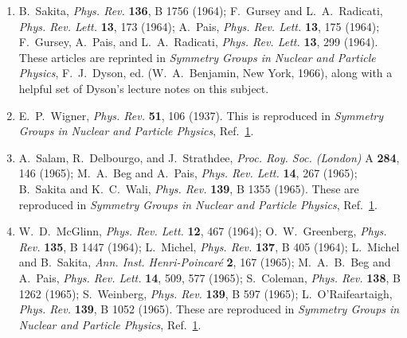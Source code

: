


\begin{enumerate}
  \item {}\label{ch24-ref-1}
  B.~Sakita, \textit{Phys. Rev.} \textbf{136}, B 1756 (1964);
  F.~Gursey and L.~A.~Radicati, \textit{Phys. Rev. Lett.} \textbf{13},
  173 (1964); A.~Pais, \textit{Phys. Rev. Lett.} \textbf{13}, 175
  (1964); F.~Gursey, A.~Pais, and L.~A.~Radicati,
  \textit{Phys. Rev. Lett.} \textbf{13}, 299 (1964). These articles are
  reprinted in \textit{Symmetry Groups in Nuclear and Particle Physics},
  F.~J.~Dyson, ed. (W.~A.~Benjamin, New York, 1966), along with a helpful
  set of Dyson's lecture notes on this subject.

  \item {}\label{ch24-ref-2}
  E.~P.~Wigner, \textit{Phys. Rev.} \textbf{51}, 106 (1937). This is
  reproduced in \textit{Symmetry Groups in Nuclear and Particle Physics},
  Ref.~\hyperref[ch24-ref-1]{1}.

  \item {}\label{ch24-ref-3}
  A.~Salam, R.~Delbourgo, and J.~Strathdee,
  \textit{Proc. Roy. Soc. (London)} A \textbf{284}, 146 (1965);
  M.~A.~Beg and A.~Pais, \textit{Phys. Rev. Lett.} \textbf{14}, 267
  (1965); B.~Sakita and K.~C.~Wali, \textit{Phys. Rev.} \textbf{139},
  B 1355 (1965). These are reproduced in
  \textit{Symmetry Groups in Nuclear and Particle Physics},
  Ref.~\hyperref[ch24-ref-1]{1}.

  \item {}\label{ch24-ref-4}
  W.~D.~McGlinn, \textit{Phys. Rev. Lett.} \textbf{12}, 467 (1964);
  O.~W.~Greenberg, \textit{Phys. Rev.} \textbf{135}, B 1447 (1964);
  L.~Michel, \textit{Phys. Rev.} \textbf{137}, B 405 (1964);
  L.~Michel and B.~Sakita, \textit{Ann. Inst. Henri-Poincar\'e}
  \textbf{2}, 167 (1965); M.~A.~B.~Beg and A.~Pais,
  \textit{Phys. Rev. Lett.} \textbf{14}, 509, 577 (1965);
  S.~Coleman, \textit{Phys. Rev.} \textbf{138}, B 1262 (1965);
  S.~Weinberg, \textit{Phys. Rev.} \textbf{139}, B 597 (1965);
  L.~O'Raifeartaigh, \textit{Phys. Rev.} \textbf{139}, B 1052 (1965).
  These are reproduced in
  \textit{Symmetry Groups in Nuclear and Particle Physics},
  Ref.~\hyperref[ch24-ref-1]{1}.


\end{enumerate}
